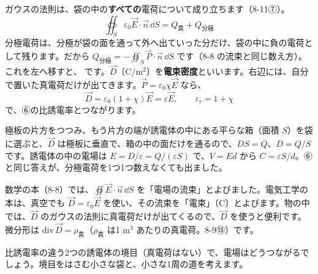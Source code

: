 ガウスの法則は、袋の中の\textbf{すべての}電荷について成り立ちます（8-11⑦）。
\[\oiint_S\varepsilon_0\vec E\cdot\vec n\,\dd S=Q_{\text{真}}+Q_{\text{分極}}\]
分極電荷は、分極が袋の面を通って外へ出ていった分だけ、袋の中に負の電荷として残ります。だから $Q_{\text{分極}}=-\oiint_S\vec P\cdot\vec n\,\dd S$ です（8-8 の流束と同じ数え方）。これを左へ移すと、
\label{ph:電-3:D}です。$\vec D$〔C/m$^2$〕を\textbf{電束密度}といいます。右辺には、自分で置いた真電荷だけが出てきます。$\vec P=\varepsilon_0\chi\vec E$ なら、
\[\vec D=\varepsilon_0(1+\chi)\vec E=\varepsilon\vec E,\qquad\varepsilon_{\mathrm r}=1+\chi\]
で、⑥の比誘電率とつながります。

極板の片方をつつみ、もう片方の端が誘電体の中にある平らな箱（面積 $S$）を袋に選ぶと、$\vec D$ は極板に垂直で、箱の中の面だけを通るので、$DS=Q$、$D=Q/S$ です。誘電体の中の電場は $E=D/\varepsilon=Q/(\varepsilon S)$ で、$V=Ed$ から $C=\varepsilon S/d$。⑥と同じ答えが、分極電荷を1つ1つ数えなくても出ました。

\begin{seikaku}
数学の本（8-8）では、$\oiint\vec E\cdot\vec n\,\dd S$ を「電場の流束」とよびました。電気工学の本は、真空でも $\vec D=\varepsilon_0\vec E$ を使い、その流束を「電束」〔C〕とよびます。物の中では、$\vec D$ のガウスの法則に真電荷だけが出てくるので、$\vec D$ を使うと便利です。微分形は $\mathrm{div}\,\vec D=\rho_{\text{真}}$（$\rho_{\text{真}}$ は1 m$^3$ あたりの真電荷。8-9⑬）です。
\end{seikaku}

\label{ph:電-3:sec9}
比誘電率の違う2つの誘電体の境目（真電荷はない）で、電場はどうつながるでしょう。境目をはさむ小さな袋と、小さな1周の道を考えます。


